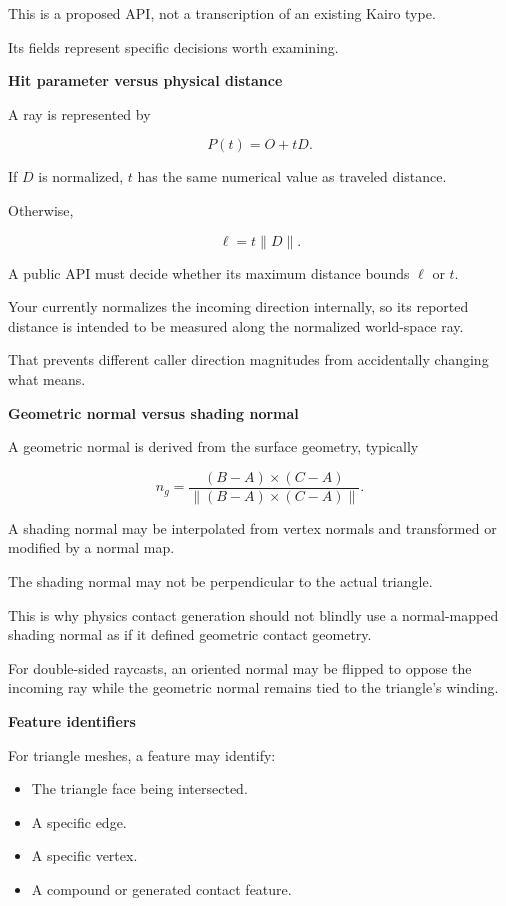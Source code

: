 This is a proposed API, not a transcription of an existing Kairo type.

Its fields represent specific decisions worth examining.

\textbf{Hit parameter versus physical distance}

A ray is represented by

\[
P(t)=O+tD.
\]

If \(D\) is normalized, \(t\) has the same numerical value as traveled distance.

Otherwise,

\[
\ell=t\|D\|.
\]

A public API must decide whether its maximum distance bounds \(\ell\) or \(t\).

Your  currently normalizes the incoming direction internally, so its reported distance is intended to be measured along the normalized world-space ray.

That prevents different caller direction magnitudes from accidentally changing what  means.

\textbf{Geometric normal versus shading normal}

A geometric normal is derived from the surface geometry, typically

\[
n_g=\frac{(B-A)\times(C-A)} {\|(B-A)\times(C-A)\|}.
\]

A shading normal may be interpolated from vertex normals and transformed or modified by a normal map.

The shading normal may not be perpendicular to the actual triangle.

This is why physics contact generation should not blindly use a normal-mapped shading normal as if it defined geometric contact geometry.

For double-sided raycasts, an oriented normal may be flipped to oppose the incoming ray while the geometric normal remains tied to the triangle's winding.

\textbf{Feature identifiers}

For triangle meshes, a feature may identify:

\begin{itemize}
\tightlist
\item
  The triangle face being intersected.
\item
  A specific edge.
\item
  A specific vertex.
\item
  A compound or generated contact feature.
\end{itemize}

